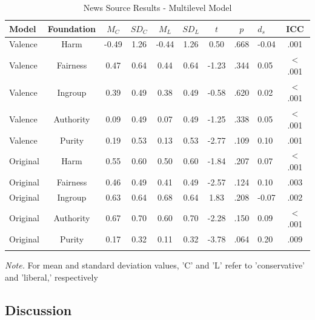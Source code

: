 \documentclass[
  man,floatsintext]{apa6}
\begin{document}
\begin{table}[ht]

\begin{center}
\begin{threeparttable}

\caption{\label{tab:exp1-table}News Source Results - Multilevel Model}

\footnotesize{

\begin{tabular}{lccccccclc}
\toprule
Model & Foundation & $M_C$ & $SD_C$ & $M_L$ & $SD_L$ & $t$ & $p$ & $d_s$ & ICC\\
\midrule
Valence & Harm & -0.49 & 1.26 & -0.44 & 1.26 & 0.50 & .668 & -0.04 & .001\\
Valence & Fairness & 0.47 & 0.64 & 0.44 & 0.64 & -1.23 & .344 & 0.05 & < .001\\
Valence & Ingroup & 0.39 & 0.49 & 0.38 & 0.49 & -0.58 & .620 & 0.02 & < .001\\
Valence & Authority & 0.09 & 0.49 & 0.07 & 0.49 & -1.25 & .338 & 0.05 & < .001\\
Valence & Purity & 0.19 & 0.53 & 0.13 & 0.53 & -2.77 & .109 & 0.10 & .001\\
Original & Harm & 0.55 & 0.60 & 0.50 & 0.60 & -1.84 & .207 & 0.07 & < .001\\
Original & Fairness & 0.46 & 0.49 & 0.41 & 0.49 & -2.57 & .124 & 0.10 & .003\\
Original & Ingroup & 0.63 & 0.64 & 0.68 & 0.64 & 1.83 & .208 & -0.07 & .002\\
Original & Authority & 0.67 & 0.70 & 0.60 & 0.70 & -2.28 & .150 & 0.09 & < .001\\
Original & Purity & 0.17 & 0.32 & 0.11 & 0.32 & -3.78 & .064 & 0.20 & .009\\
\bottomrule
\addlinespace
\end{tabular}

}

\begin{tablenotes}[para]
\normalsize{\textit{Note.} For mean and standard deviation values, 'C' and 'L' refer to 'conservative' and 'liberal,' respectively}
\end{tablenotes}

\end{threeparttable}
\end{center}

\end{table}

\subsection{Discussion}\label{discussion-1}
\end{document}

